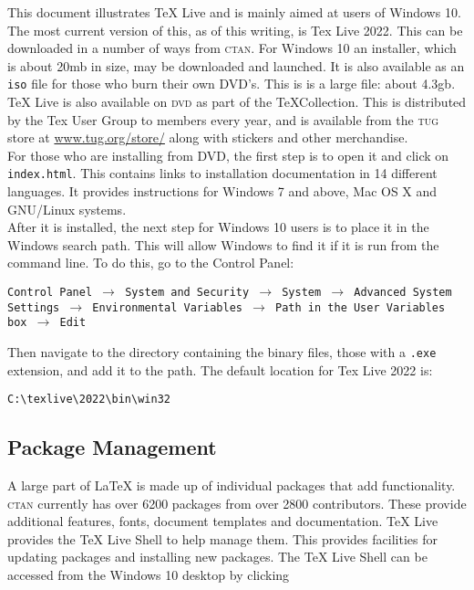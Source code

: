 \documentclass[12pt, a4paper]{article}
\begin{document}
This document illustrates TeX Live and is mainly aimed at users of Windows 10. The most current version of this, as of this writing, is Tex Live 2022. This can be downloaded in a number of ways from \textsc{ctan}. For Windows 10 an installer, which is about 20mb in size, may be downloaded and launched. It is also available as an \texttt{iso} file for those who burn their own DVD's. This is is a large file: about 4.3gb. TeX Live is also available on \textsc{dvd} as part of the \TeX Collection. This is distributed by the Tex User Group to members every year, and is available from the \textsc{tug} store at \url{www.tug.org/store/} along with stickers and other merchandise. \\

For those who are installing from DVD, the first step is to open it and click on \texttt{index.html}. This contains links to installation documentation in 14 different languages. It provides instructions for Windows 7 and above, Mac OS X and GNU/Linux systems. \\

After it is installed, the next step for Windows 10 users is to place it in the Windows search path. This will allow Windows to find it if it is run from the command line. To do this, go to the Control Panel:


\begin{flushleft}
\texttt{Control Panel $\rightarrow$ System and Security $\rightarrow$ System $\rightarrow$ Advanced System Settings $\rightarrow$ Environmental Variables $\rightarrow$ Path in the User Variables box $\rightarrow$ Edit}
\end{flushleft}


Then navigate to the directory containing the binary files, those with a \texttt{.exe} extension, and add it to the path. The default location for Tex Live 2022 is: 

{\small
\begin{verbatim}
C:\texlive\2022\bin\win32
\end{verbatim}
}

\subsection{Package Management}

A large part of LaTeX is made up of individual packages that add functionality. \textsc{ctan} currently has over 6200 packages from over 2800 contributors. These provide additional features, fonts, document templates and documentation. TeX Live provides the TeX Live Shell to help manage them. This provides facilities for updating packages and installing new packages. The TeX Live Shell can be accessed from the Windows 10 desktop by clicking 
\end{document}
